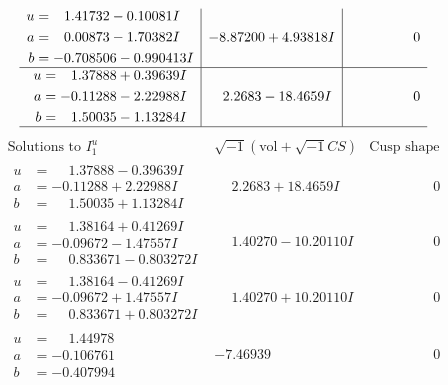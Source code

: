 \documentclass[1p]{elsarticle_modified}
\theoremstyle{definition}
\newcommand{\I}{\sqrt{-1}}
\begin{document}
$$\begin{array}{c|c|c}
\begin{aligned}
u &= \phantom{-}1.41732 - 0.10081 I \\
a &= \phantom{-}0.00873 - 1.70382 I \\
b &= -0.708506 - 0.990413 I\end{aligned}
 & -8.87200 + 4.93818 I & \phantom{-0.000000 } 0 \\ \hline\begin{aligned}
u &= \phantom{-}1.37888 + 0.39639 I \\
a &= -0.11288 - 2.22988 I \\
b &= \phantom{-}1.50035 - 1.13284 I\end{aligned}
 & \phantom{-}2.2683 - 18.4659 I & \phantom{-0.000000 } 0\\
 \hline 
 \end{array}$$\newpage$$\begin{array}{c|c|c}  
\text{Solutions to }I^u_{1}& \I (\text{vol} + \sqrt{-1}CS) & \text{Cusp shape}\\
 \hline 
\begin{aligned}
u &= \phantom{-}1.37888 - 0.39639 I \\
a &= -0.11288 + 2.22988 I \\
b &= \phantom{-}1.50035 + 1.13284 I\end{aligned}
 & \phantom{-}2.2683 + 18.4659 I & \phantom{-0.000000 } 0 \\ \hline\begin{aligned}
u &= \phantom{-}1.38164 + 0.41269 I \\
a &= -0.09672 - 1.47557 I \\
b &= \phantom{-}0.833671 - 0.803272 I\end{aligned}
 & \phantom{-}1.40270 - 10.20110 I & \phantom{-0.000000 } 0 \\ \hline\begin{aligned}
u &= \phantom{-}1.38164 - 0.41269 I \\
a &= -0.09672 + 1.47557 I \\
b &= \phantom{-}0.833671 + 0.803272 I\end{aligned}
 & \phantom{-}1.40270 + 10.20110 I & \phantom{-0.000000 } 0 \\ \hline\begin{aligned}
u &= \phantom{-}1.44978\phantom{ +0.000000I} \\
a &= -0.106761\phantom{ +0.000000I} \\
b &= -0.407994\phantom{ +0.000000I}\end{aligned}
 & -7.46939\phantom{ +0.000000I} & \phantom{-0.000000 } 0 \\ \hline\begin{aligned}

\end{aligned}
\end{array}$$
\end{document}
